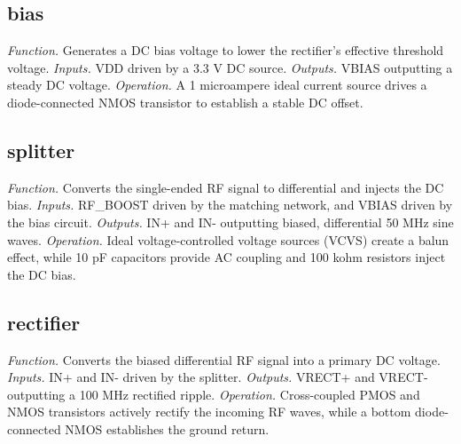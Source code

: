 \documentclass{ieeeaccess}
\begin{document}
\subsection{bias}
\textit{Function.} Generates a DC bias voltage to lower the rectifier's effective threshold voltage.
\textit{Inputs.} VDD driven by a 3.3 V DC source.
\textit{Outputs.} VBIAS outputting a steady DC voltage.
\textit{Operation.} A 1 microampere ideal current source drives a diode-connected NMOS transistor to establish a stable DC offset.
\subsection{splitter}
\textit{Function.} Converts the single-ended RF signal to differential and injects the DC bias.
\textit{Inputs.} RF\_BOOST driven by the matching network, and VBIAS driven by the bias circuit.
\textit{Outputs.} IN+ and IN- outputting biased, differential 50 MHz sine waves.
\textit{Operation.} Ideal voltage-controlled voltage sources (VCVS) create a balun effect, while 10 pF capacitors provide AC coupling and 100 kohm resistors inject the DC bias.
\subsection{rectifier}
\textit{Function.} Converts the biased differential RF signal into a primary DC voltage.
\textit{Inputs.} IN+ and IN- driven by the splitter.
\textit{Outputs.} VRECT+ and VRECT- outputting a 100 MHz rectified ripple.
\textit{Operation.} Cross-coupled PMOS and NMOS transistors actively rectify the incoming RF waves, while a bottom diode-connected NMOS establishes the ground return.
\end{document}
